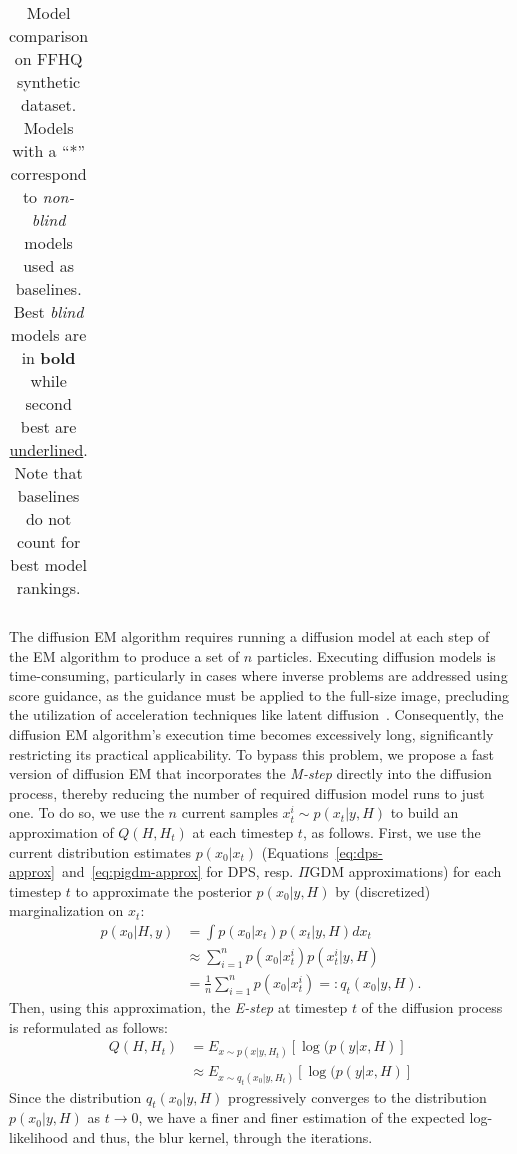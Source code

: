 \documentclass[10pt,twocolumn,letterpaper]{article}
\begin{document}
\begin{table*}[t]
{\begin{tabular}{|c|c|cccc|cc|cc|}
        \hline
    \end{tabular}%
    }
    \caption{Model comparison on FFHQ synthetic dataset. Models with a ``*'' correspond to \emph{non-blind} models used as baselines. Best \emph{blind} models are in \textbf{bold} while second best are \underline{underlined}. Note that baselines do not count for best model rankings.}
    \label{tab:ffhq_test}
\end{table*}
%
The diffusion EM algorithm requires 
%
running a diffusion model at each step of the EM algorithm to produce a set of $n$ particles. Executing diffusion models is time-consuming, particularly in cases where inverse problems are addressed using score guidance, as the guidance must be applied to the full-size image, precluding the utilization of acceleration techniques like latent diffusion~\cite{rombach2022high}. Consequently, the diffusion EM algorithm's execution time becomes excessively long, significantly restricting its practical applicability.
\newline
\newline
To bypass this problem, we propose a fast version of diffusion EM that incorporates the \textit{M-step} directly into the diffusion process, thereby reducing the number of required diffusion model runs to just one. 
%
To do so, we use the $n$ current samples $x_t^i \sim p(x_t|y, H)$ to build an approximation of $Q(H, H_t)$ at each timestep $t$, as follows.
%
First, we use the current distribution estimates $p(x_0|x_t)$ (Equations~\eqref{eq:dps-approx}~and~\eqref{eq:pigdm-approx} for DPS, resp. $\Pi$GDM approximations) for each timestep $t$ to approximate the posterior $p(x_0|y, H)$ by (discretized) marginalization on $x_t$:
%
%
\begin{align}
    p(x_0|H, y) & = \int p(x_0|x_t)p(x_t|y, H) dx_t \\
    & \approx \sum_{i=1}^n{p(x_0|x_t^i)p(x_t^i|y, H)} \\
    & = \frac{1}{n}\sum_{i=1}^n{p(x_0|x_t^i)} =: q_t(x_0|y,H). 
\end{align}
%
Then, using this approximation, the \textit{E-step} at timestep $t$ of the diffusion process is reformulated as follows:
%
\begin{align}
    Q(H, H_t) & = E_{x \sim p(x|y, H_t)}[\log(p(y|x,H)] \\
    & \approx E_{x \sim q_t(x_0|y,H_t)}[\log(p(y|x,H)]
\end{align}
%
Since the distribution $q_t(x_0|y,H)$ progressively converges to the distribution $p(x_0|y, H)$ as $t\to 0$, we have a finer and finer estimation of the expected log-likelihood and thus, the blur kernel, through the iterations. 
\end{document}
